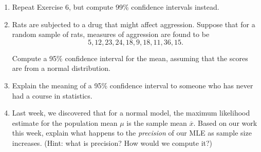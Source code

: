 \documentclass[10pt]{article}
\begin{document}
\begin{enumerate}
\item Repeat Exercise 6, but compute 99\% confidence intervals instead.

  \item Rats are subjected to a drug that might affect aggression.  Suppose that for a random sample of rats, measures of aggression are found to be
    \[
      5, 12, 23, 24, 18, 9, 18, 11, 36, 15.
    \]

    \noindent
    Compute a 95\% confidence interval for the mean, assuming that the scores are from a normal distribution.

  \item Explain the meaning of a 95\% confidence interval to someone who has never had a course in statistics.

    \item Last week, we discovered that for a normal model, the maximum likelihood estimate for the population mean $\mu$ is the sample mean $\overline{x}$.  Based on our work this week, explain what happens to the {\it precision} of our MLE as sample size increases. (Hint: what is precision? How would we compute it?)
\end{enumerate}
\end{document}
